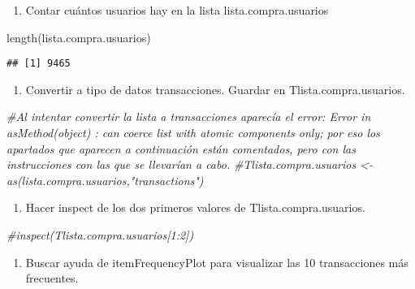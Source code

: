 \documentclass[
]{book}
\newenvironment{Shaded}{\begin{snugshade}}{\end{snugshade}}
\newcommand{\CommentTok}[1]{\textcolor[rgb]{0.56,0.35,0.01}{\textit{#1}}}
\newcommand{\FunctionTok}[1]{\textcolor[rgb]{0.00,0.00,0.00}{#1}}
\newcommand{\NormalTok}[1]{#1}
\providecommand{\tightlist}{%
  \setlength{\itemsep}{0pt}\setlength{\parskip}{0pt}}
\begin{document}
\begin{enumerate}
\def\labelenumi{\arabic{enumi}.}
\setcounter{enumi}{15}
\tightlist
\item
  Contar cuántos usuarios hay en la lista lista.compra.usuarios
\end{enumerate}

\begin{Shaded}
\begin{Highlighting}[]
\FunctionTok{length}\NormalTok{(lista.compra.usuarios)}
\end{Highlighting}
\end{Shaded}

\begin{verbatim}
## [1] 9465
\end{verbatim}

\begin{enumerate}
\def\labelenumi{\arabic{enumi}.}
\setcounter{enumi}{16}
\tightlist
\item
  Convertir a tipo de datos transacciones. Guardar en Tlista.compra.usuarios.
\end{enumerate}

\begin{Shaded}
\begin{Highlighting}[]
\CommentTok{\#Al intentar convertir la lista a transacciones aparecía el error: Error in asMethod(object) : can coerce list with atomic components only; por eso los apartados que aparecen a continuación están comentados, pero con las instrucciones con las que se llevarían a cabo.}
\CommentTok{\#Tlista.compra.usuarios \textless{}{-} as(lista.compra.usuarios,"transactions")}
\end{Highlighting}
\end{Shaded}

\begin{enumerate}
\def\labelenumi{\arabic{enumi}.}
\setcounter{enumi}{17}
\tightlist
\item
  Hacer inspect de los dos primeros valores de Tlista.compra.usuarios.
\end{enumerate}

\begin{Shaded}
\begin{Highlighting}[]
\CommentTok{\#inspect(Tlista.compra.usuarios[1:2])}
\end{Highlighting}
\end{Shaded}

\begin{enumerate}
\def\labelenumi{\arabic{enumi}.}
\setcounter{enumi}{18}
\tightlist
\item
  Buscar ayuda de itemFrequencyPlot para visualizar las 10 transacciones más frecuentes.
\end{enumerate}
\end{document}
